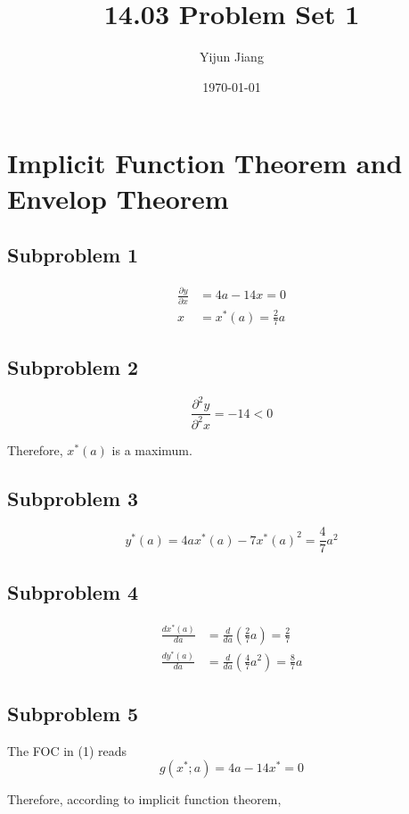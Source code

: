 \documentclass{article}
\title{14.03 Problem Set 1}
\author{Yijun Jiang}
\date{\today}
\begin{document}
\maketitle
\section{Implicit Function Theorem and Envelop Theorem}
\subsection{Subproblem 1}
\begin{align*}
	\frac{\partial y}{\partial x}&=4a-14x=0\\
	x&=x^*(a)=\frac{2}{7}a
\end{align*}

\subsection{Subproblem 2}
\begin{equation*}
	\frac{\partial^2y}{\partial^2x}=-14<0
\end{equation*}

Therefore, $x^*(a)$ is a maximum.

\subsection{Subproblem 3}
\begin{equation*}
	y^*(a)=4ax^*(a)-7x^*(a)^2=\frac{4}{7}a^2
\end{equation*}

\subsection{Subproblem 4}
\begin{align*}
	\frac{dx^*(a)}{da}&=\frac{d}{da}\left(\frac{2}{7}a\right)=\frac{2}{7}\\
	\frac{dy^*(a)}{da}&=\frac{d}{da}\left(\frac{4}{7}a^2\right)=\frac{8}{7}a
\end{align*}

\subsection{Subproblem 5}
The FOC in (1) reads
\begin{equation*}
	g(x^*;a)=4a-14x^*=0
\end{equation*}

Therefore, according to implicit function theorem,
\end{document}
